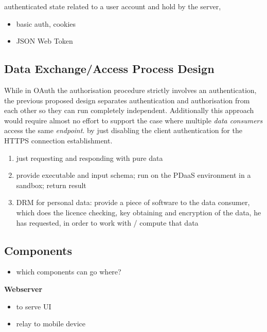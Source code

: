 \documentclass[12pt,english,a4paper,titlepage,cleardoublepage=empty,dottedtoc]{report}
\providecommand{\tightlist}{%
  \setlength{\itemsep}{0pt}\setlength{\parskip}{0pt}}
\begin{document}
authenticated state related to a user account and hold by the server,

\begin{itemize}
\tightlist
\item
  basic auth, cookies
\item
  JSON Web Token
\end{itemize}

\subsection{Data Exchange/Access Process
Design}\label{data-exchangeaccess-process-design}

While in OAuth the authorisation procedure strictly involves an
authentication, the previous proposed design separates authentication
and authorisation from each other so they can run completely
independent. Additionally this approach would require almost no effort
to support the case where multiple \emph{data consumers} access the same
\emph{endpoint}. by just disabling the client authentication for the
HTTPS connection establishment.

\begin{enumerate}
\def\labelenumi{\Alph{enumi})}
\tightlist
\item
  just requesting and responding with pure data
\item
  provide executable and input schema; run on the PDaaS environment in a
  sandbox; return result
\item
  DRM for personal data: provide a piece of software to the data
  consumer, which does the licence checking, key obtaining and
  encryption of the data, he has requested, in order to work with /
  compute that data
\end{enumerate}

\subsection{Components}\label{components}

\begin{itemize}
\tightlist
\item
  which components can go where?
\end{itemize}

\textbf{Webserver}

\begin{itemize}
\tightlist
\item
  to serve UI
\item
  relay to mobile device
\end{itemize}
\end{document}
